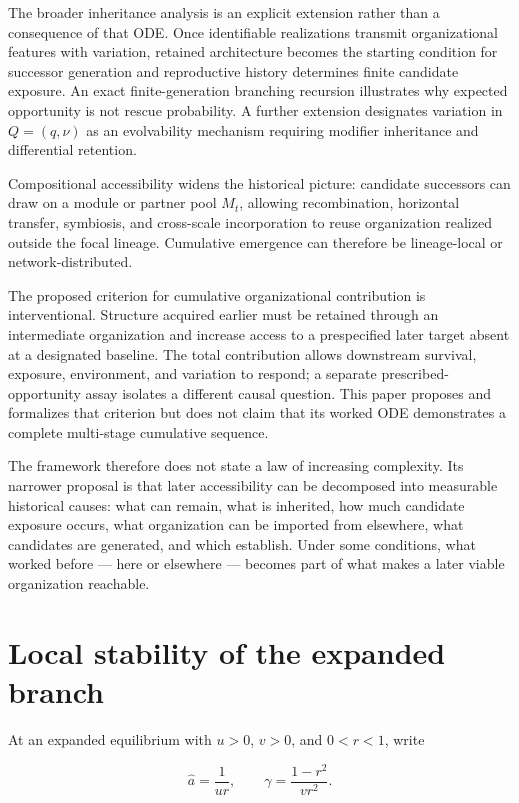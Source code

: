 \documentclass[11pt,a4paper]{article}
\begin{document}
The broader inheritance analysis is an explicit extension rather than a consequence of that ODE. Once identifiable realizations transmit organizational features with variation, retained architecture becomes the starting condition for successor generation and reproductive history determines finite candidate exposure. An exact finite-generation branching recursion illustrates why expected opportunity is not rescue probability. A further extension designates variation in $Q=(q,\nu)$ as an evolvability mechanism requiring modifier inheritance and differential retention.

Compositional accessibility widens the historical picture: candidate successors can draw on a module or partner pool $M_t$, allowing recombination, horizontal transfer, symbiosis, and cross-scale incorporation to reuse organization realized outside the focal lineage. Cumulative emergence can therefore be lineage-local or network-distributed.

The proposed criterion for cumulative organizational contribution is interventional. Structure acquired earlier must be retained through an intermediate organization and increase access to a prespecified later target absent at a designated baseline. The total contribution allows downstream survival, exposure, environment, and variation to respond; a separate prescribed-opportunity assay isolates a different causal question. This paper proposes and formalizes that criterion but does not claim that its worked ODE demonstrates a complete multi-stage cumulative sequence.

The framework therefore does not state a law of increasing complexity. Its narrower proposal is that later accessibility can be decomposed into measurable historical causes: what can remain, what is inherited, how much candidate exposure occurs, what organization can be imported from elsewhere, what candidates are generated, and which establish. Under some conditions, what worked before --- here or elsewhere --- becomes part of what makes a later viable organization reachable.

\appendix
\section{Local stability of the expanded branch}
\label{app:stability}

At an expanded equilibrium with $u>0$, $v>0$, and $0<r<1$, write

\[
\hat a=\frac{1}{ur},
\qquad
\gamma=\frac{1-r^2}{vr^2}.
\]
\end{document}
